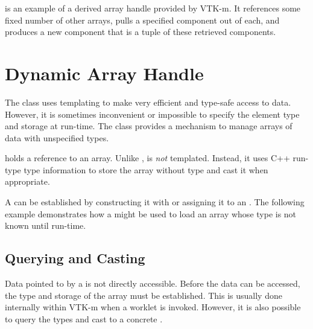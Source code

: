 is an example of a derived array
handle provided by VTK-m. It references some fixed number of other arrays,
pulls a specified component out of each, and produces a new component that
is a tuple of these retrieved components.





\section{Dynamic Array Handle}
\label{sec:DynamicArrayHandle}


The  class uses templating to make very
efficient and type-safe access to data. However, it is sometimes
inconvenient or impossible to specify the element type and storage at
run-time. The  class provides a mechanism
to manage arrays of data with unspecified types.

 holds a reference to an array. Unlike
,  is
\emph{not} templated. Instead, it uses C++ run-type type information to
store the array without type and cast it when appropriate.

A  can be established by constructing it
with or assigning it to an . The following
example demonstrates how a  might be
used to load an array whose type is not known until run-time.


\subsection{Querying and Casting}
\label{sec:DynamicArrayHandleQueryingAndCasting}

Data pointed to by a  is not directly
accessible. Before the data can be accessed, the type and storage of the
array must be established. This is usually done internally within VTK-m
when a worklet  is invoked. However, it is also possible to
query the types and cast to a concrete .

